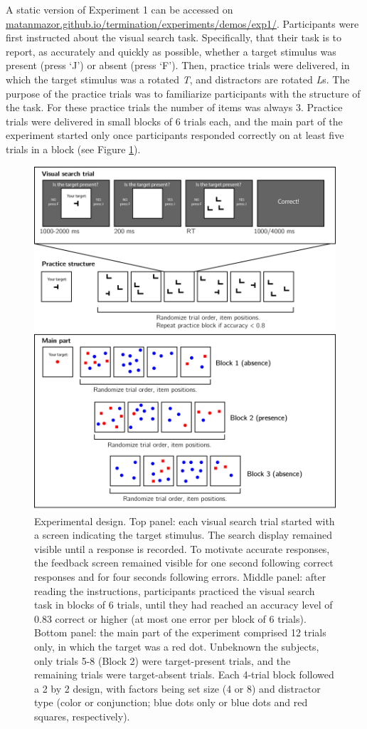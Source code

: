 \documentclass[12pt,twoside]{reedthesis}
\begin{document}
A static version of Experiment 1 can be accessed on \url{matanmazor.github.io/termination/experiments/demos/exp1/}. Participants were first instructed about the visual search task. Specifically, that their task is to report, as accurately and quickly as possible, whether a target stimulus was present (press `J') or absent (press `F'). Then, practice trials were delivered, in which the target stimulus was a rotated \emph{T}, and distractors are rotated \emph{L}s. The purpose of the practice trials was to familiarize participants with the structure of the task. For these practice trials the number of items was always 3. Practice trials were delivered in small blocks of 6 trials each, and the main part of the experiment started only once participants responded correctly on at least five trials in a block (see Figure \ref{fig:ch1-exp1-design}).
\begin{figure}
\includegraphics[width=\textwidth]{figure/ch1/designExp1} \caption[Experimental design for Exp. 1]{Experimental design. Top panel: each visual search trial started with a screen indicating the target stimulus. The search display remained visible until a response is recorded. To motivate accurate responses, the feedback screen remained visible for one second following correct responses and for four seconds following errors. Middle panel: after reading the instructions, participants practiced the visual search task in blocks of 6 trials, until they had reached an accuracy level of 0.83 correct or higher (at most one error per block of 6 trials). Bottom panel: the main part of the experiment comprised 12 trials only, in which the target was a red dot. Unbeknown the subjects, only trials 5-8 (Block 2) were target-present trials, and the remaining trials were target-absent trials. Each 4-trial block followed a 2 by 2 design, with factors being set size (4 or 8) and distractor type (color or conjunction; blue dots only or blue dots and red squares, respectively).}\label{fig:ch1-exp1-design}

\end{figure}
\end{document}
